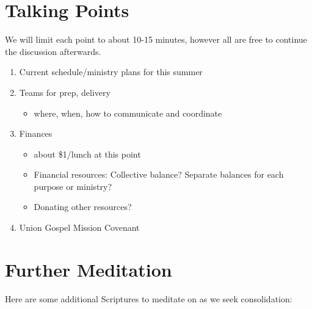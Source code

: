 \documentclass[10pt]{article}
\begin{document}
\section{Talking Points}
    We will limit each point to about 10-15 minutes, however all are free to continue the discussion afterwards.
    \begin{enumerate}
        \item{Current schedule/ministry plans for this summer}
        \item{Teams for prep, delivery}
            \begin{itemize}\item{where, when, how to communicate and coordinate}\end{itemize}
        \item{Finances}
            \begin{itemize}
                \item{about \$1/lunch at this point}
                \item{Financial resources: Collective balance? Separate balances for each purpose or ministry?}
                \item{Donating other resources?}
            \end{itemize}
        \item{Union Gospel Mission Covenant}
    \end{enumerate}

\section{Further Meditation}
    Here are some additional Scriptures to meditate on as we seek consolidation:
    \begin{enumerate}
    \end{enumerate}
\end{document}

